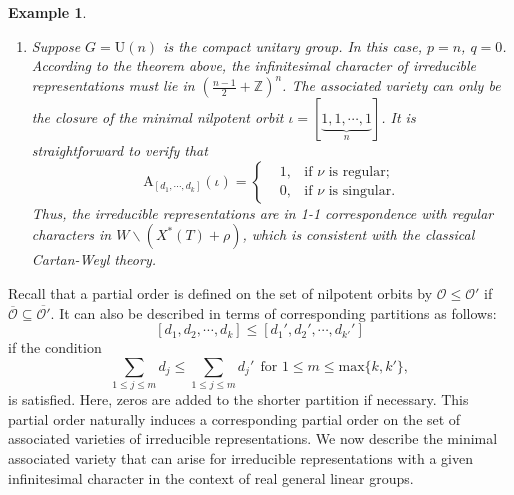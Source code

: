\documentclass[12pt, a4paper]{amsart}
\numberwithin{equation}{section}
\newtheorem{examp}[thm]{Example}
\newcommand{\BZ}{{\mathbb {Z}}}
\newcommand{\CO}{{\mathcal {O}}}
\newcommand{\U}{{\mathrm{U}}}
\renewcommand{\bar}{\overline}
\begin{document}
\begin{examp}
\begin{enumerate}
        \item Suppose $G = \U(n)$ is the compact unitary group. In this case, $p = n$, $q = 0$. According to the theorem above, the infinitesimal character of irreducible representations must lie in $(\frac{n-1}{2} + \BZ)^n$. The associated variety can only be the closure of the minimal nilpotent orbit $\iota = [\underbrace{1,1,\cdots,1}_{n}]$. It is straightforward to verify that
            \begin{equation*}
            \mathrm{A}_{[d_1,\cdots,d_{k}]}(\iota) = \left\{
            \begin{aligned}
                & 1, & \textrm{if $\nu$ is regular};  \\ 
                &0, & \textrm{if $\nu$ is singular}.
            \end{aligned}
            \right.
        \end{equation*}
        Thus, the irreducible representations are in 1-1 correspondence with regular characters in $W \backslash (X^*(T) + \rho)$, which is consistent with the classical Cartan-Weyl theory.
    \end{enumerate}
    
\end{examp}




Recall that a partial order is defined on the set of nilpotent orbits by $\CO \leq \CO'$ if $\bar{\CO} \subseteq \bar{\CO'}$. It can also be described in terms of corresponding partitions as follows: 
\[
[d_1, d_2, \cdots , d_k] \leq [d_1', d_2', \cdots , d_{k'}']
\]
if the condition
\[
    \sum_{1 \leq j \leq m} d_{j} \leq \sum_{1 \leq j \leq m} d_{j}' \  \ \textrm{for $1 \leq m \leq \mathrm{max}\{k,k'\}$},
\]
is satisfied. Here, zeros are added to the shorter partition if necessary.
This partial order naturally induces a corresponding partial order on the set of associated varieties of irreducible representations. We now describe the minimal associated variety that can arise for irreducible representations with a given infinitesimal character in the context of real general linear groups.
\end{document}
